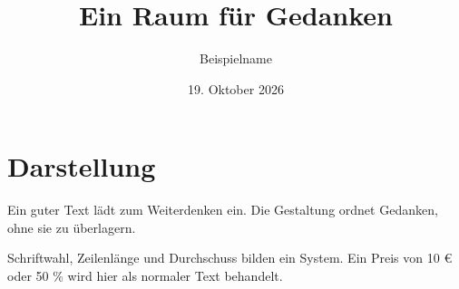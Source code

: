 \documentclass[12pt,a4paper,ngerman,DIV=12,BCOR=0mm,twoside]{scrartcl}
\title{Ein Raum für Gedanken}
\author{Beispielname}
\date{19. Oktober 2026}
\begin{document}
\maketitle
\section*{Darstellung}
Ein guter Text lädt zum Weiterdenken ein. Die Gestaltung ordnet Gedanken, ohne sie zu überlagern.

Schriftwahl, Zeilenlänge und Durchschuss bilden ein System. Ein Preis von 10 € oder 50 \% wird hier als normaler Text behandelt.
\end{document}
